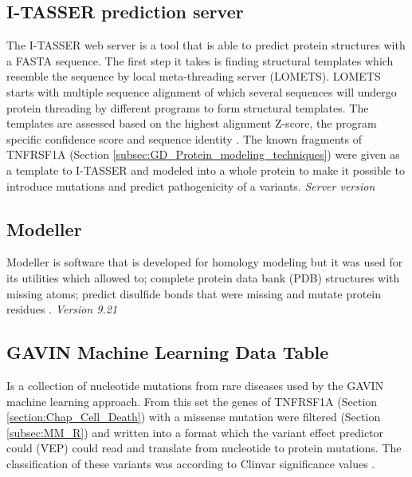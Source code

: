 \subsection{I-TASSER prediction server}
The I-TASSER web server is a tool that is able to predict protein structures with a FASTA sequence. The first step it takes is finding structural templates which resemble the sequence by local meta-threading server (LOMETS). LOMETS starts with multiple sequence alignment of which several sequences will undergo protein threading by different programs to form structural templates. The templates are assessed based on the highest alignment Z-score, the program specific confidence score and sequence identity \cite{}.
The known fragments of TNFRSF1A (Section \ref{subsec:GD_Protein_modeling_techniques}) were given as a template to I-TASSER and modeled into a whole protein to make it possible to introduce mutations and predict pathogenicity of a variants.
\label{subsec:MM_I_TASSER}
\newline
\textit{Server version}

\subsection{Modeller}
Modeller is software that is developed for homology modeling but it was used for its utilities which allowed to; complete protein data bank (PDB) structures with missing atoms; predict disulfide bonds that were missing and mutate protein residues \cite{}. 
\label{subsec:MM_Modeller}
\newline
\textit{Version 9.21}

\subsection{GAVIN Machine Learning Data Table}
Is a collection of nucleotide mutations from rare diseases used by the GAVIN \cite{} machine learning approach. From this set the genes of TNFRSF1A (Section \ref{section:Chap_Cell_Death}) with a missense mutation were filtered (Section \ref{subsec:MM_R}) and written into a format which the variant effect predictor could (VEP) \cite{} could read and translate from nucleotide to protein mutations. The classification of these variants was according to Clinvar significance values \cite{}. 
\label{subsec:MM_GAVIN_data_table}

